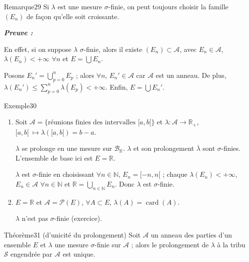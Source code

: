 \documentclass[11pt,a4paper]{article}
\newcommand{\R}{\mathbb{R}}
\newcommand{\N}{\mathbb{N}}
\newcommand{\A}{\mathscr{A}}
\newcommand{\B}{\mathscr{B}}
\newcommand{\Pp}{\mathscr{P}}
\newcommand{\Ss}{\mathscr{S}}
\newenvironment{preuve}{\par\textit{\textbf{Preuve :}}\par\nopagebreak[4]}{\par}
\begin{document}
\begin{enonce}{Remarque}{29}
Si $\lambda$ est une mesure $\sigma$-finie, on peut toujours choisir la famille $(E_n)$ de façon qu'elle soit croissante.
\end{enonce}

\begin{preuve}
En effet, si on suppose $\lambda$ $\sigma$-finie, alors il existe $(E_n)\subset\A$, avec $E_n\in\A$, $\lambda(E_n)<+\infty$ $\forall n$ et $E=\bigcup E_n$.

Posons $E_n'=\bigcup_{p=0}^{n}E_p$ ; alors $\forall n$, $E_n'\in\A$ car $\A$ est un anneau.
De plus, $\lambda(E_n')\le\sum_{p=0}^{n}\lambda(E_p)<+\infty$. Enfin, $E=\bigcup E_n'$.
\end{preuve}

\begin{enonce}{Exemple}{30}
\begin{enumerate}[label=\textbf{\arabic*-},leftmargin=1.2cm]
  \item Soit $\A=\{\text{réunions finies des intervalles }[a,b[\}$ et
        $\lambda:\A\to\R_+$, $[a,b[\ \longmapsto\lambda([a,b[)=b-a$.

        $\lambda$ se prolonge en une mesure sur $\B_{\R}$. $\lambda$ et son prolongement $\overline{\lambda}$ sont $\sigma$-finies.
        L'ensemble de base ici est $E=\R$.

        $\lambda$ est $\sigma$-finie en choisissant $\forall n\in\N$, $E_n=[-n,n[$ ; chaque $\lambda(E_n)<+\infty$, $E_n\in\A$ $\forall n\in\N$
        et $\R=\bigcup_{n\in\N}E_n$. Donc $\lambda$ est $\sigma$-finie.
  \item $E=\R$ et $\A=\Pp(E)$, $\forall A\subset E$, $\lambda(A)=\operatorname{card}(A)$.

        $\lambda$ n'est pas $\sigma$-finie (exercice).
\end{enumerate}
\end{enonce}

\begin{enonce}{Théorème}{31 \textnormal{(d'unicité du prolongement)}}
Soit $\A$ un anneau des parties d'un ensemble $E$ et $\lambda$ une mesure $\sigma$-finie sur $\A$ ; alors le prolongement de $\lambda$ à la tribu $\Ss$ engendrée par $\A$ est unique.
\end{enonce}
\end{document}
